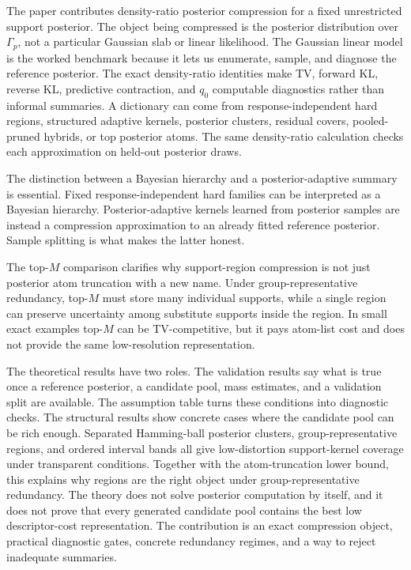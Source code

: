 \documentclass[twoside,11pt]{article}
\begin{document}
The paper contributes density-ratio posterior compression for a fixed unrestricted support posterior. The object being compressed is the posterior distribution over \(\Gamma_p\), not a particular Gaussian slab or linear likelihood. The Gaussian linear model is the worked benchmark because it lets us enumerate, sample, and diagnose the reference posterior. The exact density-ratio identities make TV, forward KL, reverse KL, predictive contraction, and \(q_0\) computable diagnostics rather than informal summaries. A dictionary can come from response-independent hard regions, structured adaptive kernels, posterior clusters, residual covers, pooled-pruned hybrids, or top posterior atoms. The same density-ratio calculation checks each approximation on held-out posterior draws.

The distinction between a Bayesian hierarchy and a posterior-adaptive summary is essential. Fixed response-independent hard families can be interpreted as a Bayesian hierarchy. Posterior-adaptive kernels learned from posterior samples are instead a compression approximation to an already fitted reference posterior. Sample splitting is what makes the latter honest.

The top-\(M\) comparison clarifies why support-region compression is not just posterior atom truncation with a new name. Under group-representative redundancy, top-\(M\) must store many individual supports, while a single region can preserve uncertainty among substitute supports inside the region. In small exact examples top-\(M\) can be TV-competitive, but it pays atom-list cost and does not provide the same low-resolution representation.

The theoretical results have two roles. The validation results say what is true once a reference posterior, a candidate pool, mass estimates, and a validation split are available. The assumption table turns these conditions into diagnostic checks. The structural results show concrete cases where the candidate pool can be rich enough. Separated Hamming-ball posterior clusters, group-representative regions, and ordered interval bands all give low-distortion support-kernel coverage under transparent conditions. Together with the atom-truncation lower bound, this explains why regions are the right object under group-representative redundancy. The theory does not solve posterior computation by itself, and it does not prove that every generated candidate pool contains the best low descriptor-cost representation. The contribution is an exact compression object, practical diagnostic gates, concrete redundancy regimes, and a way to reject inadequate summaries.
\end{document}
